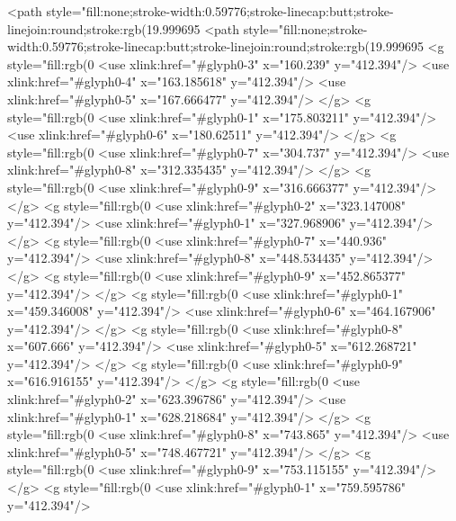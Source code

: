 <path style="fill:none;stroke-width:0.59776;stroke-linecap:butt;stroke-linejoin:round;stroke:rgb(19.999695%
<path style="fill:none;stroke-width:0.59776;stroke-linecap:butt;stroke-linejoin:round;stroke:rgb(19.999695%
<g style="fill:rgb(0%
  <use xlink:href="#glyph0-3" x="160.239" y="412.394"/>
  <use xlink:href="#glyph0-4" x="163.185618" y="412.394"/>
  <use xlink:href="#glyph0-5" x="167.666477" y="412.394"/>
</g>
<g style="fill:rgb(0%
  <use xlink:href="#glyph0-1" x="175.803211" y="412.394"/>
  <use xlink:href="#glyph0-6" x="180.62511" y="412.394"/>
</g>
<g style="fill:rgb(0%
  <use xlink:href="#glyph0-7" x="304.737" y="412.394"/>
  <use xlink:href="#glyph0-8" x="312.335435" y="412.394"/>
</g>
<g style="fill:rgb(0%
  <use xlink:href="#glyph0-9" x="316.666377" y="412.394"/>
</g>
<g style="fill:rgb(0%
  <use xlink:href="#glyph0-2" x="323.147008" y="412.394"/>
  <use xlink:href="#glyph0-1" x="327.968906" y="412.394"/>
</g>
<g style="fill:rgb(0%
  <use xlink:href="#glyph0-7" x="440.936" y="412.394"/>
  <use xlink:href="#glyph0-8" x="448.534435" y="412.394"/>
</g>
<g style="fill:rgb(0%
  <use xlink:href="#glyph0-9" x="452.865377" y="412.394"/>
</g>
<g style="fill:rgb(0%
  <use xlink:href="#glyph0-1" x="459.346008" y="412.394"/>
  <use xlink:href="#glyph0-6" x="464.167906" y="412.394"/>
</g>
<g style="fill:rgb(0%
  <use xlink:href="#glyph0-8" x="607.666" y="412.394"/>
  <use xlink:href="#glyph0-5" x="612.268721" y="412.394"/>
</g>
<g style="fill:rgb(0%
  <use xlink:href="#glyph0-9" x="616.916155" y="412.394"/>
</g>
<g style="fill:rgb(0%
  <use xlink:href="#glyph0-2" x="623.396786" y="412.394"/>
  <use xlink:href="#glyph0-1" x="628.218684" y="412.394"/>
</g>
<g style="fill:rgb(0%
  <use xlink:href="#glyph0-8" x="743.865" y="412.394"/>
  <use xlink:href="#glyph0-5" x="748.467721" y="412.394"/>
</g>
<g style="fill:rgb(0%
  <use xlink:href="#glyph0-9" x="753.115155" y="412.394"/>
</g>
<g style="fill:rgb(0%
  <use xlink:href="#glyph0-1" x="759.595786" y="412.394"/>
